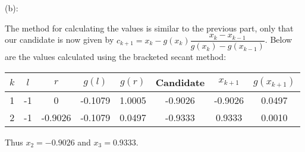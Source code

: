 \documentclass{eh-homework}
\begin{document}
\begin{question}{4}
    (b):

    The method for calculating the values is similar to the previous part, only that our candidate is now given by \(c_{k+1} = x_k - g(x_k) \dfrac{x_k - x_{k-1}}{g(x_k) - g(x_{k-1})}\). Below are the values calculated using the bracketed secant method:
    \begin{center}
        \begin{tabular}{c|c|c|c|c|c|c|c}
            \(k\) & \(l\) & \(r\) & \(g(l)\) & \(g(r)\) & Candidate & \(x_{k+1}\) & \(g(x_{k+1})\) \\
            \hline
            1 & -1 & 0 & -0.1079 & 1.0005 & -0.9026 & -0.9026 & 0.0497 \\
            2 & -1 & -0.9026 & -0.1079 & 0.0497 & -0.9333 & 0.9333 & 0.0010
        \end{tabular}
    \end{center}
    Thus \(x_2 = -0.9026\) and \(x_3 = 0.9333\).
    \end{question}
    \newpage
\end{document}
